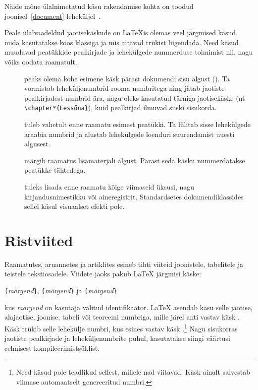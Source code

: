 Näide mõne ülalnimetatud käsu rakendamise kohta on toodud
joonisel~\ref{document} leheküljel~\pageref{document}.

Peale ülalvaadeldud jaotisekäskude on \LaTeX is olemas veel järgmised
käsud, mida kasutatakse koos klassiga  ja mis aitavad trükist
liigendada. Need käsud muudavad peatükkide pealkirjade ja lehekülgede
nummerduse toimimist nii, nagu võiks oodata raamatult.
\begin{description}
\item[\normalfont{}] peaks olema kohe esimene käsk pärast
dokumendi sisu algust (\verb||). Ta vormistab
leheküljenumbrid rooma numbritega ning jätab jaotiste pealkirjadest
numbrid ära, nagu oleks kasutatud tärniga jaotisekäske (nt
\verb|\chapter*{Eessõna}|),
kuid pealkirjad ilmuvad siiski sisukorda.
\item[\normalfont{}] tuleb vahetult enne raamatu esimest
peatükki. Ta lülitab sisse lehekülgede araabia numbrid ja alustab
lehekülgede loenduri suurendamist uuesti algusest.
\item[\normalfont{}] märgib raamatus lisamaterjali algust.
Pärast seda käsku nummerdatakse peatükke tähtedega.
\item[\normalfont{}] tuleks lisada enne raamatu kõige
viimaseid üksusi, nagu kirjandusnimestikku või aineregistrit.
Standardsetes dokumendiklassides sellel käsul visuaalset efekti pole.
\end{description}

\section{Ristviited}

Raamatutes, aruannetes ja artiklites esineb tihti
viiteid
joonistele, tabelitele ja teistele tekstiosadele. Viidete jaoks pakub
\LaTeX{} järgmisi käske:
\begin{lscommand}
\verb|{|\emph{märgend}\verb|}|, \verb|{|\emph{märgend}\verb|}|
ja \verb|{|\emph{märgend}\verb|}|
\end{lscommand}
\noindent kus \emph{märgend} on kasutaja valitud identifikaator. \LaTeX{}
asendab käsu  selle jaotise, alajaotise, joonise, tabeli või
teoreemi numbriga, mille järel anti vastav käsk . Käsk
 trükib selle lehekülje numbri, kus esines vastav
käsk .\footnote{Need käsud pole teadlikud sellest, millele
nad viitavad. Käsk  ainult salvestab viimase automaatselt
genereeritud numbri.} Nagu sisukorras jaotiste pealkirjade ja
leheküljenumbrite puhul, kasutatakse siingi väärtusi eelmisest
kompileerimistsüklist.

